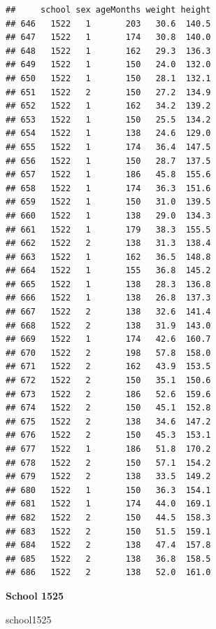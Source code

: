 \documentclass[
  12pt,
]{book}
\newenvironment{Shaded}{\begin{snugshade}}{\end{snugshade}}
\newcommand{\NormalTok}[1]{#1}
\begin{document}
\begin{verbatim}
##     school sex ageMonths weight height
## 646   1522   1       203   30.6  140.5
## 647   1522   1       174   30.8  140.0
## 648   1522   1       162   29.3  136.3
## 649   1522   1       150   24.0  132.0
## 650   1522   1       150   28.1  132.1
## 651   1522   2       150   27.2  134.9
## 652   1522   1       162   34.2  139.2
## 653   1522   1       150   25.5  134.2
## 654   1522   1       138   24.6  129.0
## 655   1522   1       174   36.4  147.5
## 656   1522   1       150   28.7  137.5
## 657   1522   1       186   45.8  155.6
## 658   1522   1       174   36.3  151.6
## 659   1522   1       150   31.0  139.5
## 660   1522   1       138   29.0  134.3
## 661   1522   1       179   38.3  155.5
## 662   1522   2       138   31.3  138.4
## 663   1522   1       162   36.5  148.8
## 664   1522   1       155   36.8  145.2
## 665   1522   1       138   28.3  136.8
## 666   1522   1       138   26.8  137.3
## 667   1522   2       138   32.6  141.4
## 668   1522   2       138   31.9  143.0
## 669   1522   1       174   42.6  160.7
## 670   1522   2       198   57.8  158.0
## 671   1522   2       162   43.9  153.5
## 672   1522   2       150   35.1  150.6
## 673   1522   2       186   52.6  159.6
## 674   1522   2       150   45.1  152.8
## 675   1522   2       138   34.6  147.2
## 676   1522   2       150   45.3  153.1
## 677   1522   1       186   51.8  170.2
## 678   1522   2       150   57.1  154.2
## 679   1522   2       138   33.5  149.2
## 680   1522   1       150   36.3  154.1
## 681   1522   1       174   44.0  169.1
## 682   1522   2       150   44.5  158.3
## 683   1522   2       150   51.5  159.1
## 684   1522   2       138   47.4  157.8
## 685   1522   2       138   36.8  158.5
## 686   1522   2       138   52.0  161.0
\end{verbatim}

\textbf{School 1525}

\begin{Shaded}
\begin{Highlighting}[]
\NormalTok{school1525}
\end{Highlighting}
\end{Shaded}
\end{document}
